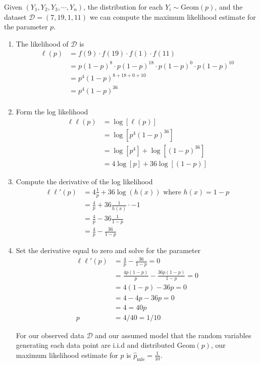 \ex  Given $(Y_{1},Y_{2},Y_{3}, \cdots, Y_{n})$, the distribution for each $Y_{i} \sim \text{Geom}(p)$, and the dataset $\mathcal{D} = (7, 19, 1, 11)$ we can compute the maximum likelihood estimate for the parameter $p$. 
\begin{enumerate}
    \item The likelihood of $\mathcal{D}$ is
    \begin{align}
        \ell(p) &= f(9) \cdot f(19) \cdot f(1) \cdot f(11)\\
                &= p(1-p)^{8} \cdot p(1-p)^{18} \cdot p(1-p)^{0} \cdot p(1-p)^{10}\\
                &= p^{4} (1-p)^{8+18+0+10}\\
                &= p^{4} (1-p)^{36}\\
    \end{align}
    \item Form the log likelihood
    \begin{align}
        \ell \ell(p) &= \log\left[ \ell(p) \right] \\ 
                     &= \log \left[ p^{4} (1-p)^{36} \right] \\ 
                     &= \log \left[ p^{4} \right] + \log \left[(1-p)^{36} \right] \\
                     &= 4\log \left[ p \right] + 36\log \left[(1-p) \right] 
    \end{align}
    \item Compute the derivative of the log likelihood
    \begin{align}
        \ell \ell'(p) &= 4\frac{1}{p} + 36 \log( h(x) ) \text{ where } h(x) = 1-p\\
                      &= \frac{4}{p} + 36\frac{1}{h(x)} \cdot -1\\
                      &= \frac{4}{p} - 36\frac{1}{1-p} \\
                      &= \frac{4}{p} - \frac{36}{1-p}
    \end{align}
    \item Set the derivative equal to zero and solve for the parameter
    \begin{align}
        \ell \ell'(p)  &= \frac{4}{p} - \frac{36}{1-p} = 0 \\
                       &= \frac{ 4p(1-p) }{p} - \frac{36 p(1-p)}{1-p} = 0 \\ 
                       &=  4(1-p) - 36 p = 0 \\ 
                       &=  4 - 4p - 36 p = 0 \\ 
                       &=  4  = 40p \\ 
                     p &= 4/40 = 1/10  
    \end{align}
    
    For our observed data $\mathcal{D}$ and our assumed model that the random variables generating each data point are i.i.d and distributed $\text{Geom}(p)$, our maximum likelihood estimate for $p$ is $\hat{p}_{\text{mle}} = \frac{1}{10}$.

\end{enumerate}


